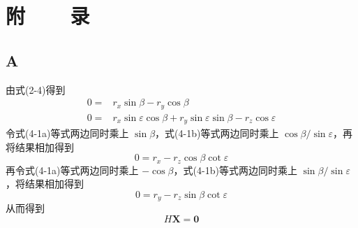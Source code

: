 %
%
%
%
%
%

\chapter*{\vskip 10bp \textmd{附~~~~录} \vskip -6bp}

\section*{A}
由式(2-4)得到
\begin{subequations}
	\begin{align}
		0=& r_x\sin\beta - r_y\cos\beta \\
		0=& r_x\sin\varepsilon\cos\beta+r_y\sin\varepsilon\sin\beta -r_z \cos\varepsilon
	\end{align}
\end{subequations}
令式(4-1a)等式两边同时乘上 $\sin\beta$，式(4-1b)等式两边同时乘上 $\cos\beta/\sin\varepsilon$，再将结果相加得到
\begin{equation}
	0=r_x - r_z \cos\beta\cot\varepsilon
\end{equation}
再令式(4-1a)等式两边同时乘上 $-\cos\beta$，式(4-1b)等式两边同时乘上 $\sin\beta/\sin\varepsilon$，将结果相加得到
\begin{equation}
	0=r_y - r_z\sin\beta\cot\varepsilon
\end{equation}
从而得到
\begin{equation}
	H \bm{X} = \bm{0}
\end{equation}

\setcounter{section}{1}

